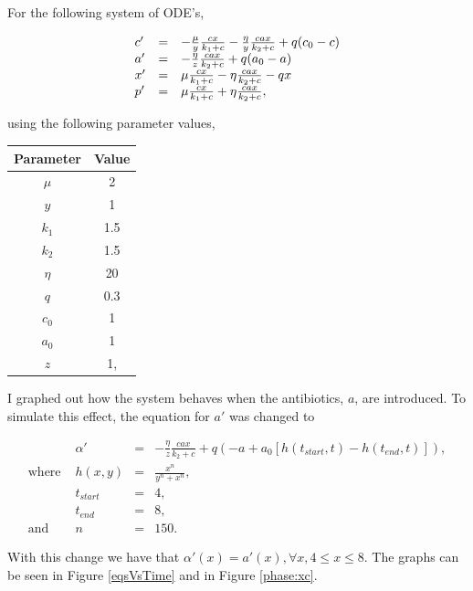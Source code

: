 \documentclass{article}
\begin{document}
For the following system of ODE's,

\begin{equation}
  \label{eq:sys}
  \begin{array}{l c l}
    c' &=& -\frac{\mu}{y} \frac{cx}{k_1 +c} - \frac{\eta}{y} \frac{cax}{k_2 +c} + q(c_0 - c) \\
    a' &=& -\frac{\eta}{z} \frac{cax}{k_2+c} + q (a_0 -a)\\
    x' &=& \mu \frac{cx}{k_1+c} - \eta \frac{cax}{k_2+c} - qx\\
    p' &=& \mu \frac{cx}{k_1 +c} + \eta \frac{cax}{k_2+c},
  \end{array}
\end{equation}


using the following parameter values,

\begin{center}
  \begin{tabular}{c|c}
    Parameter & Value \\
    \hline
    $\mu$ & 2 \\
    $y$ & 1\\
    $k_1$ & 1.5\\
    $k_2$ & 1.5\\
    $\eta$ & 20 \\
    $q$ & 0.3 \\
    $c_0$ & 1\\
    $a_0$ & 1\\
    $z$ & 1,
  \end{tabular}
\end{center}

I graphed out how the system behaves when the antibiotics, $a$, are introduced. To simulate this effect, the equation for $a'$ was changed to

\begin{equation}
  \begin{array}{llcl}
    &\alpha' &=& -\frac{\eta}{z} \frac{cax}{k_2+c} + q (-a + a_0 [h(t_{start},t) - h(t_{end},t)]), \\
    \text{where }& h(x,y) &=& \frac{x^n}{y^n + x^n}, \\
    &t_{start} &=& 4, \\
    &t_{end} &=& 8,\\
    \text{and }&n &=& 150. 
  \end{array}
\end{equation}

With this change we have that $\alpha'(x) = a'(x), \forall x, 4 \le x \le 8$. The graphs can be seen in Figure \ref{eqsVsTime} and in Figure \ref{phase:xc}.
\end{document}
